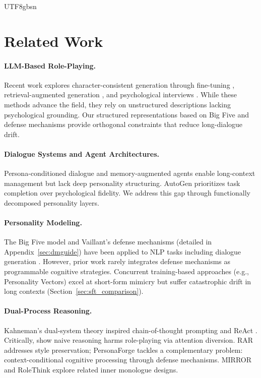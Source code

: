 \documentclass[11pt]{article}
\begin{document}
\begin{CJK*}{UTF8}{gbsn}
\section{Related Work}

\paragraph{LLM-Based Role-Playing.}
Recent work explores character-consistent generation through fine-tuning \citep{shao2023character}, retrieval-augmented generation \citep{wang2024rolellm}, and psychological interviews \citep{wang2024incharacter}. While these methods advance the field, they rely on unstructured descriptions lacking psychological grounding. Our structured representations based on Big Five and defense mechanisms provide orthogonal constraints that reduce long-dialogue drift.

\paragraph{Dialogue Systems and Agent Architectures.}
Persona-conditioned dialogue \citep{zhang2018personalizing} and memory-augmented agents \citep{packer2023memgpt,park2023generative} enable long-context management but lack deep personality structuring. AutoGen \citep{wu2024autogen} prioritizes task completion over psychological fidelity. We address this gap through functionally decomposed personality layers.

\paragraph{Personality Modeling.}
The Big Five model and Vaillant's defense mechanisms (detailed in Appendix~\ref{sec:dmguide}) have been applied to NLP tasks including dialogue generation \citep{zhong2020towards}. However, prior work rarely integrates defense mechanisms as programmable cognitive strategies. Concurrent training-based approaches (e.g., Personality Vectors) excel at short-form mimicry but suffer catastrophic drift in long contexts (Section~\ref{sec:sft_comparison}).

\paragraph{Dual-Process Reasoning.}
Kahneman's dual-system theory \citep{kahneman2011thinking} inspired chain-of-thought prompting \citep{wei2022chain} and ReAct \citep{yao2022react}. Critically, \citet{feng2025reasoning} show naive reasoning harms role-playing via attention diversion. RAR \citep{tang2025thinking} addresses style preservation; PersonaForge tackles a complementary problem: context-conditional cognitive processing through defense mechanisms. MIRROR \citep{hsing2025mirrormodularinternalprocessing} and RoleThink \citep{xu2025guess} explore related inner monologue designs.


\end{CJK*}
\end{document}
